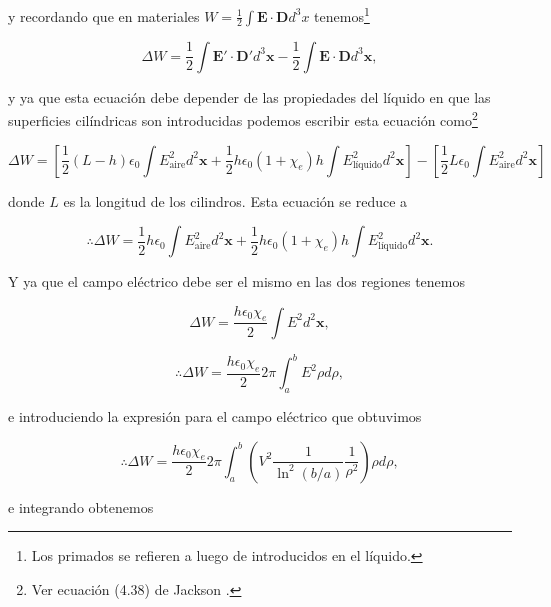 \documentclass[a4paper,11pt]{article}
\numberwithin{equation}{section}
\begin{document}
y recordando que en materiales $W = \frac{1}{2}\int \mathbf{E}\cdot \mathbf{D} d^3x$
tenemos\footnote{Los primados se refieren a luego de introducidos en el líquido.}

\begin{equation}
 \Delta W = \frac{1}{2}\int \mathbf{E}'\cdot \mathbf{D}' d^3 \mathbf{x} - 
 \frac{1}{2}\int \mathbf{E}\cdot \mathbf{D} d^3 \mathbf{x},
\end{equation}

y ya que esta ecuación debe depender de las propiedades del líquido en que 
las superficies cilíndricas son introducidas podemos escribir esta ecuación 
como\footnote{Ver ecuación (4.38) de Jackson \cite{jackson}.}

\begin{equation*}
 \Delta W = \left[\frac{1}{2}(L -h)\epsilon_0  \int E_{\text{aire}}^2 d^2 \mathbf{x} 
 +  \frac{1}{2}h\epsilon_0(1 + \chi_e)h \int E_{\text{líquido}}^2 d^2 \mathbf{x} 
 \right] - \left[\frac{1}{2}L\epsilon_0\int E_{\text{aire}}^2 d^2 \mathbf{x} \right]
\end{equation*}

donde $L$ es la longitud de los cilindros. Esta ecuación se reduce a 

\begin{equation}
 \therefore \Delta W = \frac{1}{2}h\epsilon_0 \int E_{\text{aire}}^2 d^2 \mathbf{x} +
 \frac{1}{2}h\epsilon_0(1 + \chi_e)h \int E_{\text{líquido}}^2 d^2 \mathbf{x}.
\end{equation}

Y ya que el campo eléctrico debe ser el mismo en las dos regiones tenemos 

\begin{equation}
 \Delta W = \frac{h\epsilon_0 \chi_e}{2}\int E^2 d^2\mathbf{x},
\end{equation}

\begin{equation}
 \therefore \Delta W = \frac{h\epsilon_0 \chi_e}{2}2\pi \int_a^b E^2 \rho d\rho,
\end{equation}

e introduciendo la expresión para el campo eléctrico que obtuvimos 

\begin{equation}
 \therefore \Delta W = \frac{h\epsilon_0 \chi_e}{2}2\pi \int_a^b 
 \left(V^2 \frac{1}{\ln^2{(b/a)}}\frac{1}{\rho^2} \right)\rho d\rho,
\end{equation}

e integrando obtenemos 
\end{document}
